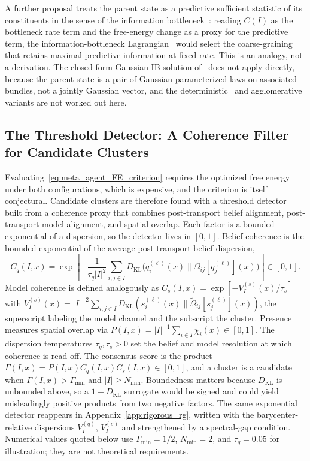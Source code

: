 \documentclass[11pt]{article}
\begin{document}
A further proposal treats the parent state as a predictive sufficient statistic of its constituents in the sense of the information bottleneck~\cite{tishby1999information}: reading $C(I)$ as the bottleneck rate term and the free-energy change as a proxy for the predictive term, the information-bottleneck Lagrangian~\cite{bialek2001predictability} would select the coarse-graining that retains maximal predictive information at fixed rate. This is an analogy, not a derivation. The closed-form Gaussian-IB solution of~\cite{chechik2005information} does not apply directly, because the parent state is a pair of Gaussian-parameterized laws on associated bundles, not a jointly Gaussian vector, and the deterministic~\cite{StrouseSchwab2017} and agglomerative~\cite{SlonimTishby2000} variants are not worked out here.

\subsection{The Threshold Detector: A Coherence Filter for Candidate Clusters}
\label{sec:meta_agent_threshold}

Evaluating~\eqref{eq:meta_agent_FE_criterion} requires the optimized free energy under both configurations, which is expensive, and the criterion is itself conjectural. Candidate clusters are therefore found with a threshold detector built from a coherence proxy that combines post-transport belief alignment, post-transport model alignment, and spatial overlap. Each factor is a bounded exponential of a dispersion, so the detector lives in $[0, 1]$. Belief coherence is the bounded exponential of the average post-transport belief dispersion,
\begin{equation}
C_q(I, x) = \exp\left[-\frac{1}{\tau_q |I|^2}\sum_{i,j \in I} D_{\mathrm{KL}}\big(q_i^{(\ell)}(x) \| \Omega_{ij}[q_j^{(\ell)}](x)\big)\right] \in [0, 1].
\end{equation}
Model coherence is defined analogously as $C_s(I, x) = \exp[-V^{(s)}_I(x)/\tau_s]$ with $V^{(s)}_I(x) = |I|^{-2}\sum_{i,j \in I} D_{\mathrm{KL}}(s_i^{(\ell)}(x) \| \tilde{\Omega}_{ij}[s_j^{(\ell)}](x))$, the superscript labeling the model channel and the subscript the cluster. Presence measures spatial overlap via $P(I, x) = |I|^{-1}\sum_{i \in I} \chi_i(x) \in [0, 1]$. The dispersion temperatures $\tau_q, \tau_s > 0$ set the belief and model resolution at which coherence is read off. The consensus score is the product $\Gamma(I, x) = P(I, x) C_q(I, x) C_s(I, x) \in [0, 1]$, and a cluster is a candidate when $\Gamma(I, x) > \Gamma_{\min}$ and $|I| \geq N_{\min}$. Boundedness matters because $D_{\mathrm{KL}}$ is unbounded above, so a $1 - D_{\mathrm{KL}}$ surrogate would be signed and could yield misleadingly positive products from two negative factors. The same exponential detector reappears in Appendix~\ref{app:rigorous_rg}, written with the barycenter-relative dispersions $V_I^{(q)}$, $V_I^{(s)}$ and strengthened by a spectral-gap condition. Numerical values quoted below use $\Gamma_{\min} = 1/2$, $N_{\min} = 2$, and $\tau_q = 0.05$ for illustration; they are not theoretical requirements.
\end{document}
